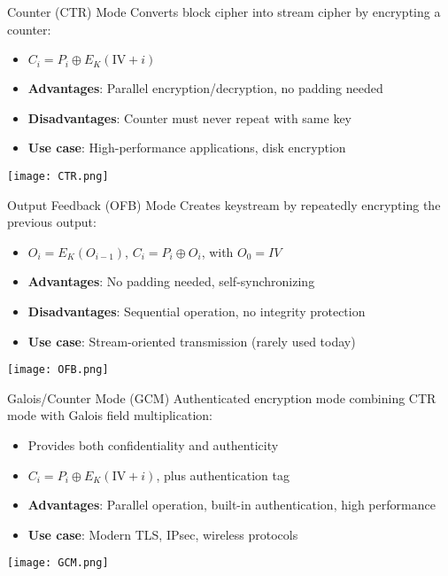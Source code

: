 \begin{definition}{Counter (CTR) Mode}
Converts block cipher into stream cipher by encrypting a counter:
\begin{itemize}
    \item $C_i = P_i \oplus E_K(\text{IV} + i)$
    \item \textbf{Advantages}: Parallel encryption/decryption, no padding needed
    \item \textbf{Disadvantages}: Counter must never repeat with same key
    \item \textbf{Use case}: High-performance applications, disk encryption
\end{itemize}
\texttt{[image: CTR.png]}
\end{definition}

\begin{definition}{Output Feedback (OFB) Mode}
Creates keystream by repeatedly encrypting the previous output:
\begin{itemize}
    \item $O_i = E_K(O_{i-1})$, $C_i = P_i \oplus O_i$, with $O_0 = IV$
    \item \textbf{Advantages}: No padding needed, self-synchronizing
    \item \textbf{Disadvantages}: Sequential operation, no integrity protection
    \item \textbf{Use case}: Stream-oriented transmission (rarely used today)
\end{itemize}
\texttt{[image: OFB.png]}
\end{definition}

\begin{definition}{Galois/Counter Mode (GCM)}
Authenticated encryption mode combining CTR mode with Galois field multiplication:
\begin{itemize}
    \item Provides both confidentiality and authenticity
    \item $C_i = P_i \oplus E_K(\text{IV} + i)$, plus authentication tag
    \item \textbf{Advantages}: Parallel operation, built-in authentication, high performance
    \item \textbf{Use case}: Modern TLS, IPsec, wireless protocols
\end{itemize}
\texttt{[image: GCM.png]}
\end{definition}

